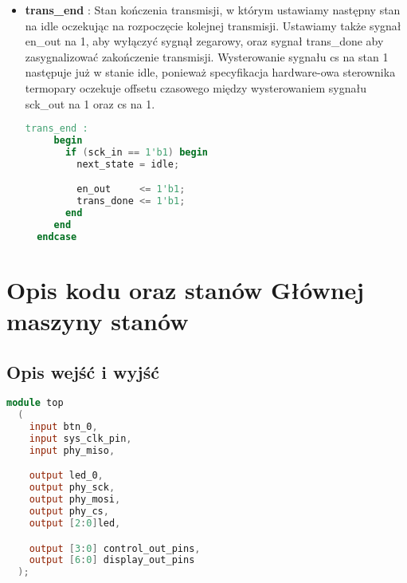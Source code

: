 \documentclass[a4paper,12pt]{article}
\begin{document}
\begin{itemize}
  \item \textbf{trans\_end} : Stan kończenia transmisji, w którym ustawiamy następny stan na idle oczekując na rozpoczęcie kolejnej transmisji. Ustawiamy także sygnał en\_out na 1, aby wyłączyć sygnął zegarowy, oraz sygnał trans\_done aby zasygnalizować zakończenie transmisji. Wysterowanie sygnału cs na stan 1 następuje już w stanie idle, ponieważ specyfikacja hardware-owa sterownika termopary oczekuje offsetu czasowego między wysterowaniem sygnału sck\_out na 1 oraz cs na 1.

\begin{lstlisting}[language=verilog]
trans_end :
     begin
       if (sck_in == 1'b1) begin
         next_state = idle;

         en_out     <= 1'b1;
         trans_done <= 1'b1;
       end
     end
  endcase
\end{lstlisting}
\end{itemize}

\section{Opis kodu oraz stanów Głównej maszyny stanów}

\subsection*{Opis wejść i wyjść}

\begin{lstlisting}[language=verilog]
    module top
  (
    input btn_0,
    input sys_clk_pin,
    input phy_miso,

    output led_0,
    output phy_sck,
    output phy_mosi,
    output phy_cs,
    output [2:0]led,

    output [3:0] control_out_pins,
    output [6:0] display_out_pins
  );
\end{lstlisting}
\end{document}
